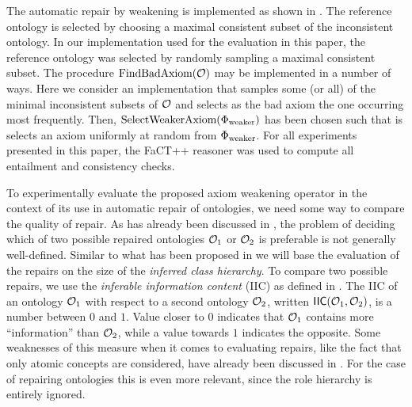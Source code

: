 \documentclass[
]{ceurart}
\begin{document}
The automatic repair by weakening is implemented as shown in . The reference ontology is selected by choosing a maximal consistent subset of the inconsistent ontology. In our implementation used for the evaluation in this paper, the reference ontology was selected by randomly sampling a maximal consistent subset. The procedure $\textnormal{FindBadAxiom}(\mathcal{O})$ may be implemented in a number of ways. Here we consider an implementation that samples some (or all) of the minimal inconsistent subsets of $\mathcal{O}$ and selects as the bad axiom the one occurring most frequently. Then, $\textnormal{SelectWeakerAxiom}(\Phi_\textnormal{weaker})$ has been chosen such that is selects an axiom uniformly at random from $\Phi_\textnormal{weaker}$. For all experiments presented in this paper, the FaCT++ reasoner \cite{tsarkov2006fact++} was used to compute all entailment and consistency checks.

To experimentally evaluate the proposed axiom weakening operator in the context of its use in automatic repair of ontologies, we need some way to compare the quality of repair. As has already been discussed in \cite{troquard2018repairing}, the problem of deciding which of two possible repaired ontologies $\mathcal{O}_1$ or $\mathcal{O}_2$ is preferable is not generally well-defined. Similar to what has been proposed in \cite{troquard2018repairing} we will base the evaluation of the repairs on the size of the \emph{inferred class hierarchy}. To compare two possible repairs, we use the \emph{inferable information content} (IIC) as defined in \cite{troquard2018repairing}. The IIC  of an ontology $\mathcal{O}_1$ with respect to a second ontology $\mathcal{O}_2$, written ${\mathsf{IIC}}(\mathcal{O}_1, \mathcal{O}_2)$, is a number between $0$ and $1$. Value closer to $0$ indicates that $\mathcal{O}_1$ contains more ``information'' than $\mathcal{O}_2$, while a value towards $1$ indicates the opposite. Some weaknesses of this measure when it comes to evaluating repairs, like the fact that only atomic concepts are considered, have already been discussed in \cite{troquard2018repairing}. For the case of repairing \SROIQ ontologies this is even more relevant, since the role hierarchy is entirely ignored.
\end{document}

